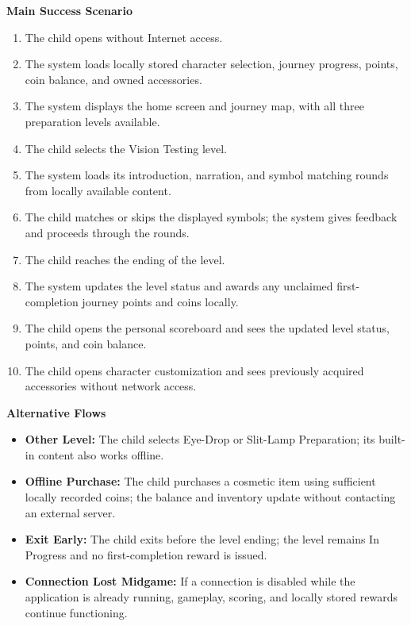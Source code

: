 \documentclass[10pt]{article}
\begin{document}
\textbf{Main Success Scenario}
\begin{enumerate}
    \item The child opens \progname{} without Internet access.
    \item The system loads locally stored character selection,
    journey progress, points, coin balance, and owned accessories.
    \item The system displays the home screen and journey map,
    with all three preparation levels available.
    \item The child selects the Vision Testing level.
    \item The system loads its introduction, narration, and
    symbol matching rounds from locally available content.
    \item The child matches or skips the displayed symbols;
    the system gives feedback and proceeds through the rounds.
    \item The child reaches the ending of the level.
    \item The system updates the level status and awards any
    unclaimed first-completion journey points and coins locally.
    \item The child opens the personal scoreboard and sees the
    updated level status, points, and coin balance.
    \item The child opens character customization and sees
    previously acquired accessories without network access.
\end{enumerate}

\textbf{Alternative Flows}
\begin{itemize}
    \item \textbf{Other Level:} The child selects Eye-Drop or
    Slit-Lamp Preparation; its built-in content also works offline.
    \item \textbf{Offline Purchase:} The child purchases a cosmetic
    item using sufficient locally recorded coins; the balance and
    inventory update without contacting an external server.
    \item \textbf{Exit Early:} The child exits before the level ending;
    the level remains In Progress and no first-completion reward
    is issued.
    \item \textbf{Connection Lost Midgame:} If a connection is
    disabled while the application is already running, gameplay,
    scoring, and locally stored rewards continue functioning.
\end{itemize}
\end{document}

